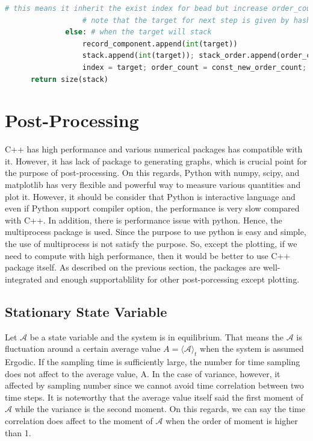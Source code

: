 \documentclass[10pt, a4paper]{article}
\begin{document}
\begin{appendices}
\begin{lstlisting}[language=python,frame=single, numbers=none]
                  # this means it inherit the exist index for bead but increase order_count
                  # note that the target for next step is given by hash[index, order_count]
              else: # when the target will stack
                  record_component.append(int(target))
                  stack.append(int(target)); stack_order.append(order_count) # record element and its order for stack
                  index = target; order_count = const_new_order_count; # depth first search
      return size(stack)
\end{lstlisting}

  
  
  \chapter{Post-Processing}
  C++ has high performance and various numerical packages has compatible with it. However, it has lack of package to generating graphs, which is crucial point for the purpose of post-processing. On this regards, Python with numpy, scipy, and matplotlib has very flexible and powerful way to measure various quantities and plot it. However, it should be consider that Python is interactive language and even if Python support compiler option, the performance is very slow compared with C++. In addition, there is performance issue with python. Hence, the multiprocess package is used. Since the purpose to use python is easy and simple, the use of multiprocess is not satisfy the purpose. So, except the plotting, if we need to compute with high performance, then it would be better to use C++ package itself. As described on the previous section, the packages are well-integrated and enough supportablility for other post-porcessing except plotting. 

  \section{Stationary State Variable}
  Let $\mathscr{A}$ be a state variable and the system is in equilibrium. That means the $\mathscr{A}$ is fluctuation around a certain average value $A = \langle \mathscr{A}\rangle_t$ when the system is assumed Ergodic. If the sampling time is sufficiently large, the number for time sampling does not affect to the average value, A. In the case of variance, however, it affected by sampling number since we cannot avoid time correlation between two time steps. It is noteworthy that the average value itself said the first moment of $\mathscr{A}$ while the variance is the second moment. On this regards, we can say the time correlation does affect to the moment of $\mathscr{A}$ when the order of moment is higher than 1.


\end{appendices}
\end{document}
